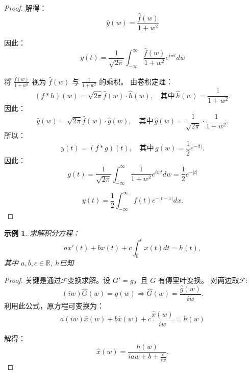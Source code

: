 \documentclass[linespread=1.5,openany]{book}%
\theoremstyle{plain}
\newtheorem{example}[theorem]{示例}
\begin{document}
{{{\begin{proof}
						解得：
						\begin{equation}
							\hat{y}(w) = \frac{\hat{f}(w)}{1 + w^2}
						\end{equation}
						
						因此：
						\begin{equation}
							y(t) = \frac{1}{\sqrt{2\pi}} \int_{-\infty}^{\infty} \frac{\hat{f}(w)}{1 + w^2} e^{iwt} dw
						\end{equation}
						
						将 \(\frac{\hat{f}(w)}{1 + w^2}\) 视为 \(\hat{f}(w)\) 与 \(\frac{1}{1 + w^2}\) 的乘积。
						由卷积定理：
						\begin{equation}
							(f * h)(w) = \sqrt{2\pi} \hat{f}(w) \cdot \hat{h}(w), \quad \text{其中} \, \hat{h}(w) = \frac{1}{1 + w^2}.
						\end{equation}
						因此：
						\begin{equation}
							\hat{y}(w) = \sqrt{2\pi} \hat{f}(w) \cdot \hat{g}(w), \quad \text{其中} \, \hat{g}(w) = \frac{1}{\sqrt{2\pi}} \cdot \frac{1}{1 + w^2}.
						\end{equation}
						所以：
						\begin{equation}
							y(t) = (f * g)(t), \quad \text{其中} \, g(w) = \frac{1}{2} e^{-|t|}.
						\end{equation}
						因此：
						\[	g(t) = \frac{1}{\sqrt{2\pi}} \int_{-\infty}^{\infty} \frac{1}{1 + w^2} e^{iwt} dw=\frac{ 1}{2}e^{-|t|}\]
						
						\begin{equation}
							y(t) = \frac{1}{2} \int_{-\infty}^{\infty} f(t) e^{-|t - x|} dx.
						\end{equation}
					\end{proof}
					\begin{example}
						求解积分方程：
						\begin{equation}
							a x'(t) + b x(t) + c \int_{0}^{t} x(t) dt = h(t),
						\end{equation}
						其中 $ a, b, c \in \mathbb{R}$,  $h  $已知\end{example}
					\begin{proof}
						关键是通过$\mathcal{F}$变换求解。设 \(G' = g\)，且 \(G\) 有傅里叶变换。	
						对两边取$\mathcal{F}$:
						\[	(iw) \hat{G}(w) = \hat{g}(w) \Rightarrow \hat{G}(w) = \frac{\hat{g}(w)}{iw}.\]
						利用此公式，原方程可变换为：
						\[	a (iw) \hat{x}(w) + b \hat{x}(w) + c \frac{\hat{x}(w)}{iw} = h(w)\]
						
						解得：
						\[\hat{x}(w) = \frac{h(w)}{iaw + b + \frac{c}{iw}}.\]
						

\end{proof}}}}
\end{document}
